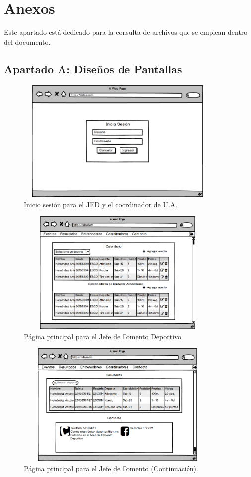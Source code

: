 \chapter{Anexos}
	\noident Este apartado está dedicado para la consulta de archivos que se emplean dentro del documento. 
	\section{Apartado A: Diseños de Pantallas}
	
		\begin{figure}[hbt!]
			\centering
			\includegraphics[width=10cm, height=6cm]{Imagenes/Nuevos/P1_LoginJFD_coord}
			\caption{Inicio sesión para el JFD y el coordinador de U.A.}
			\label{inicioJFDycoord}
		\end{figure}
		\pagebreak
		
		\begin{figure}[hbt!]
			\centering
			\includegraphics[width=10cm, height=6cm]{Imagenes/Nuevos/P2_Inicio_JefeFD}
			\caption{Página principal para el Jefe de Fomento Deportivo}
			\label{principalJFD}
		\end{figure}
	
		\begin{figure} [hbt!]
			\centering
			\includegraphics[width=10cm, height=6cm]{Imagenes/Nuevos/P3_Inicio_JefeFD1}
			\caption{Página principal para el Jefe de Fomento (Continuación).}
			\label{principalJFD1}
		\end{figure}
	
